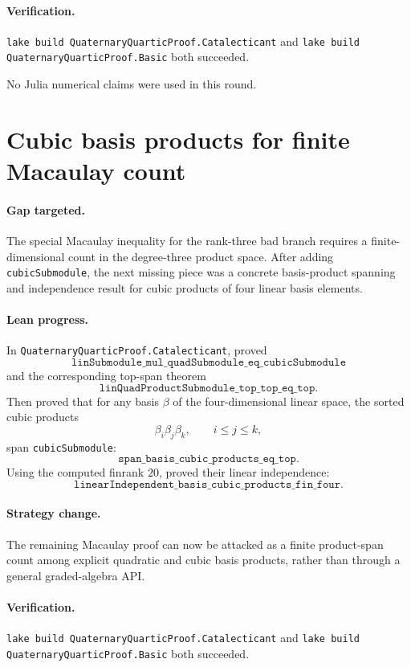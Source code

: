 \documentclass[11pt]{article}
\begin{document}
\paragraph{Verification.}
\texttt{lake build QuaternaryQuarticProof.Catalecticant} and
\texttt{lake build QuaternaryQuarticProof.Basic} both succeeded.

No Julia numerical claims were used in this round.

\section*{Cubic basis products for finite Macaulay count}

\paragraph{Gap targeted.}
The special Macaulay inequality for the rank-three bad branch requires a
finite-dimensional count in the degree-three product space.  After adding
\texttt{cubicSubmodule}, the next missing piece was a concrete basis-product
spanning and independence result for cubic products of four linear basis
elements.

\paragraph{Lean progress.}
In \texttt{QuaternaryQuarticProof.Catalecticant}, proved
\[
\texttt{linSubmodule\_mul\_quadSubmodule\_eq\_cubicSubmodule}
\]
and the corresponding top-span theorem
\[
\texttt{linQuadProductSubmodule\_top\_top\_eq\_top}.
\]
Then proved that for any basis \(\beta\) of the four-dimensional linear
space, the sorted cubic products
\[
\beta_i\beta_j\beta_k,\qquad i\le j\le k,
\]
span \texttt{cubicSubmodule}:
\[
\texttt{span\_basis\_cubic\_products\_eq\_top}.
\]
Using the computed finrank \(20\), proved their linear independence:
\[
\texttt{linearIndependent\_basis\_cubic\_products\_fin\_four}.
\]

\paragraph{Strategy change.}
The remaining Macaulay proof can now be attacked as a finite product-span
count among explicit quadratic and cubic basis products, rather than through a
general graded-algebra API.

\paragraph{Verification.}
\texttt{lake build QuaternaryQuarticProof.Catalecticant} and
\texttt{lake build QuaternaryQuarticProof.Basic} both succeeded.
\end{document}
